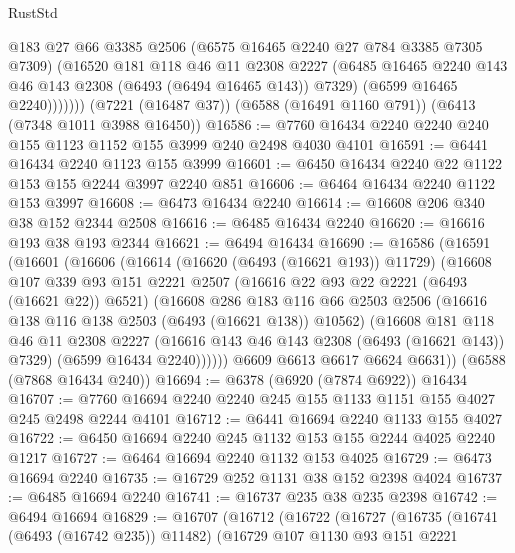 \begin{lexlean}{RustStd}
\begin{coremodule}
              @183
              @27
              @66
              @3385
              @2506
              (@6575 @16465 @2240 @27 @784 @3385 @7305 @7309)
              (@16520
                @181
                @118
                @46
                @11
                @2308
                @2227
                (@6485 @16465 @2240 @143 @46 @143 @2308 (@6493 (@6494 @16465 @143)) @7329)
                (@6599 @16465 @2240)))))))
    (@7221 (@16487 @37))
    (@6588 (@16491 @1160 @791))
    (@6413 (@7348 @1011 @3988 @16450))
@16586 := @7760 @16434 @2240 @2240 @240 @155 @1123 @1152 @155 @3999 @240 @2498 @4030 @4101
@16591 := @6441 @16434 @2240 @1123 @155 @3999
@16601 := @6450 @16434 @2240 @22 @1122 @153 @155 @2244 @3997 @2240 @851
@16606 := @6464 @16434 @2240 @1122 @153 @3997
@16608 := @6473 @16434 @2240
@16614 := @16608 @206 @340 @38 @152 @2344 @2508
@16616 := @6485 @16434 @2240
@16620 := @16616 @193 @38 @193 @2344
@16621 := @6494 @16434
@16690 := @16586
    (@16591
      (@16601
        (@16606
          (@16614
            (@16620 (@6493 (@16621 @193)) @11729)
            (@16608
              @107
              @339
              @93
              @151
              @2221
              @2507
              (@16616 @22 @93 @22 @2221 (@6493 (@16621 @22)) @6521)
              (@16608
                @286
                @183
                @116
                @66
                @2503
                @2506
                (@16616 @138 @116 @138 @2503 (@6493 (@16621 @138)) @10562)
                (@16608
                  @181
                  @118
                  @46
                  @11
                  @2308
                  @2227
                  (@16616 @143 @46 @143 @2308 (@6493 (@16621 @143)) @7329)
                  (@6599 @16434 @2240))))))
        @6609
        @6613
        @6617
        @6624
        @6631))
    (@6588 (@7868 @16434 @240))
@16694 := @6378 (@6920 (@7874 @6922)) @16434
@16707 := @7760 @16694 @2240 @2240 @245 @155 @1133 @1151 @155 @4027 @245 @2498 @2244 @4101
@16712 := @6441 @16694 @2240 @1133 @155 @4027
@16722 := @6450 @16694 @2240 @245 @1132 @153 @155 @2244 @4025 @2240 @1217
@16727 := @6464 @16694 @2240 @1132 @153 @4025
@16729 := @6473 @16694 @2240
@16735 := @16729 @252 @1131 @38 @152 @2398 @4024
@16737 := @6485 @16694 @2240
@16741 := @16737 @235 @38 @235 @2398
@16742 := @6494 @16694
@16829 := @16707
    (@16712
      (@16722
        (@16727
          (@16735
            (@16741 (@6493 (@16742 @235)) @11482)
            (@16729
              @107
              @1130
              @93
              @151
              @2221

\end{coremodule}
\end{lexlean}
